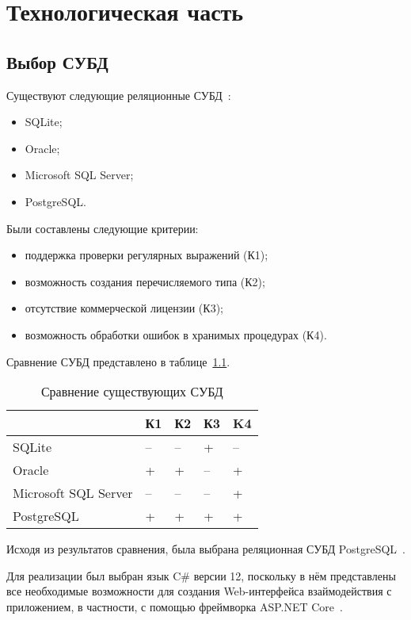 \chapter{Технологическая часть}
\section{Выбор СУБД}

Существуют следующие реляционные СУБД~\cite{dbanalyse}:
\begin{itemize}
	\item SQLite;
	\item Oracle;
	\item Microsoft SQL Server;
	\item PostgreSQL. 
\end{itemize}
Были составлены следующие критерии:
\begin{itemize}
	\item поддержка проверки регулярных выражений (К1);
	\item возможность создания перечисляемого типа (К2);
	\item отсутствие коммерческой лицензии (К3);
	\item возможность обработки ошибок в хранимых процедурах (К4).
\end{itemize}
Сравнение СУБД представлено в таблице~\ref{tbl:dbms_compr}. 
\begin{table}[h!]
	\centering
	\caption{\label{tbl:dbms_compr}Сравнение существующих СУБД}
	\begin{tabular}{|l|l|l|l|l|}
		\hline
		& К1 & К2 & К3 & K4\\\hline
		SQLite & -- & -- & + & --\\\hline
	 	Oracle & + & + & -- & + \\\hline
		Microsoft SQL Server & -- & -- & -- & +\\\hline
		PostgreSQL & + & + & + & + \\\hline
	\end{tabular}
\end{table}

Исходя из результатов сравнения, была выбрана реляционная СУБД PostgreSQL~\cite{postgresql}.

Для реализации был выбран язык C\# версии 12, поскольку в нём представлены все необходимые возможности для создания Web-интерфейса взаймодействия с приложением, в частности, с помощью фреймворка ASP.NET Core~\cite{aspnet}.


